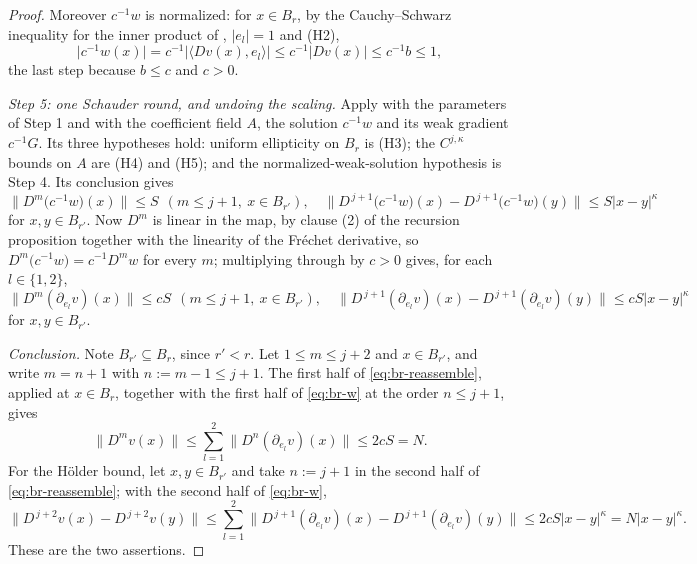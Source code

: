\begin{proof}
Moreover $c^{-1}w$ is normalized: for $x\in B_r$, by the Cauchy--Schwarz inequality for the inner
product of , $\lvert e_l\rvert=1$ and (H2),
\[
  \bigl\lvert c^{-1}w(x)\bigr\rvert
  =c^{-1}\bigl\lvert\langle Dv(x),e_l\rangle\bigr\rvert
  \le c^{-1}\lvert Dv(x)\rvert
  \le c^{-1}b\le1 ,
\]
the last step because $b\le c$ and $c>0$.

\medskip\noindent\emph{Step 5: one Schauder round, and undoing the scaling.}
Apply  with the parameters of Step 1 and with the coefficient field
$A$, the solution $c^{-1}w$ and its weak gradient $c^{-1}G$.  Its three hypotheses hold: uniform
ellipticity on $B_r$ is (H3); the $C^{j,\kappa}$ bounds on $A$ are (H4) and (H5); and the
normalized-weak-solution hypothesis is Step 4.  Its conclusion gives
\[
  \bigl\lVert D^{m}\bigl(c^{-1}w\bigr)(x)\bigr\rVert\le S\ \ (m\le j+1,\ x\in B_{r'}),
  \quad
  \bigl\lVert D^{\,j+1}\bigl(c^{-1}w\bigr)(x)-D^{\,j+1}\bigl(c^{-1}w\bigr)(y)\bigr\rVert
    \le S\lvert x-y\rvert^{\kappa}
\]
for $x,y\in B_{r'}$.  Now $D^{m}$ is linear in the map, by clause (2) of the recursion
proposition together with the linearity of the Fr\'echet derivative, so
$D^{m}\bigl(c^{-1}w\bigr)=c^{-1}D^{m}w$ for every $m$; multiplying through by $c>0$ gives, for
each $l\in\{1,2\}$,
\begin{equation}\label{eq:br-w}
  \bigl\lVert D^{m}(\partial_{e_l}v)(x)\bigr\rVert\le cS\ \ (m\le j+1,\ x\in B_{r'}),
  \quad
  \bigl\lVert D^{\,j+1}(\partial_{e_l}v)(x)-D^{\,j+1}(\partial_{e_l}v)(y)\bigr\rVert
    \le cS\lvert x-y\rvert^{\kappa}
\end{equation}
for $x,y\in B_{r'}$.

\medskip\noindent\emph{Conclusion.}
Note $B_{r'}\subseteq B_r$, since $r'<r$.  Let $1\le m\le j+2$ and $x\in B_{r'}$, and write
$m=n+1$ with $n:=m-1\le j+1$.  The first half of \eqref{eq:br-reassemble}, applied at $x\in B_r$,
together with the first half of \eqref{eq:br-w} at the order $n\le j+1$, gives
\[
  \bigl\lVert D^{m}v(x)\bigr\rVert\le\sum_{l=1}^{2}
    \bigl\lVert D^{n}(\partial_{e_l}v)(x)\bigr\rVert\le2cS=N .
\]
For the H\"older bound, let $x,y\in B_{r'}$ and take $n:=j+1$ in the second half of
\eqref{eq:br-reassemble}; with the second half of \eqref{eq:br-w},
\[
  \bigl\lVert D^{\,j+2}v(x)-D^{\,j+2}v(y)\bigr\rVert
  \le\sum_{l=1}^{2}
    \bigl\lVert D^{\,j+1}(\partial_{e_l}v)(x)-D^{\,j+1}(\partial_{e_l}v)(y)\bigr\rVert
  \le2cS\lvert x-y\rvert^{\kappa}=N\lvert x-y\rvert^{\kappa} .
\]
These are the two assertions.
\end{proof}
